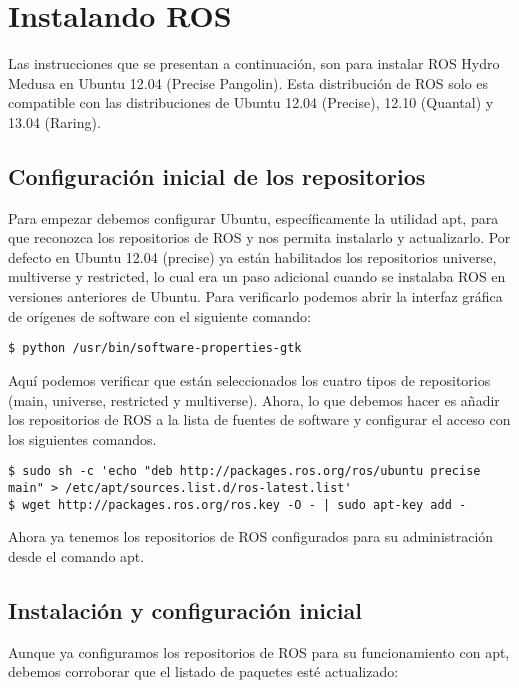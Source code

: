 \chapter{Instalando ROS}

Las instrucciones que se presentan a continuación, son para instalar ROS Hydro Medusa en Ubuntu 12.04 (Precise Pangolin). Esta distribución de ROS solo es compatible con las distribuciones de Ubuntu 12.04 (Precise), 12.10 (Quantal) y 13.04 (Raring). 

\section{Configuración inicial de los repositorios}

Para empezar debemos configurar Ubuntu, específicamente la utilidad apt, para que reconozca los repositorios de ROS y nos permita instalarlo y actualizarlo. Por defecto en Ubuntu 12.04 (precise) ya están habilitados los repositorios universe, multiverse y restricted, lo cual era un paso adicional cuando se instalaba ROS en versiones anteriores de Ubuntu. Para verificarlo podemos abrir la interfaz gráfica de orígenes de software con el siguiente comando:

\begin{lstlisting}
$ python /usr/bin/software-properties-gtk
\end{lstlisting}

Aquí podemos verificar que están seleccionados los cuatro tipos de repositorios (main, universe, restricted y multiverse). Ahora, lo que debemos hacer es añadir los repositorios de ROS a la lista de fuentes de software y configurar el acceso con los siguientes comandos. 

\begin{lstlisting}
$ sudo sh -c 'echo "deb http://packages.ros.org/ros/ubuntu precise main" > /etc/apt/sources.list.d/ros-latest.list'
$ wget http://packages.ros.org/ros.key -O - | sudo apt-key add -
\end{lstlisting}

Ahora ya tenemos los repositorios de ROS configurados para su administración desde el comando apt.

\section{Instalación y configuración inicial}

Aunque ya configuramos los repositorios de ROS para su funcionamiento con apt, debemos corroborar que el listado de paquetes esté actualizado:


